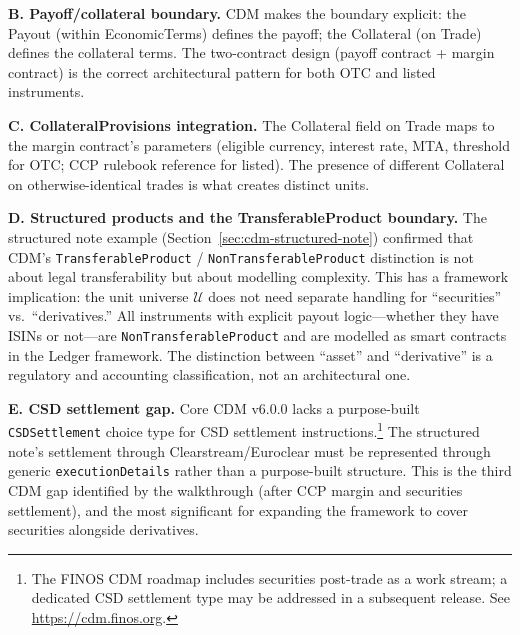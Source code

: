 \documentclass[11pt,a4paper]{article}
\begin{document}
\medskip
\noindent\textbf{B. Payoff/collateral boundary.}
CDM makes the boundary explicit: the Payout (within EconomicTerms) defines the payoff; the Collateral (on Trade) defines the collateral terms. The two-contract design (payoff contract + margin contract) is the correct architectural pattern for both OTC and listed instruments.

\medskip
\noindent\textbf{C. CollateralProvisions integration.}
The Collateral field on Trade maps to the margin contract's parameters (eligible currency, interest rate, MTA, threshold for OTC; CCP rulebook reference for listed). The presence of different Collateral on otherwise-identical trades is what creates distinct units.

\medskip
\noindent\textbf{D. Structured products and the TransferableProduct boundary.}
The structured note example (Section~\ref{sec:cdm-structured-note}) confirmed that CDM's \texttt{TransferableProduct} / \texttt{NonTransferableProduct} distinction is not about legal transferability but about modelling complexity. This has a framework implication: the unit universe $\mathcal{U}$ does not need separate handling for ``securities'' vs.\ ``derivatives.'' All instruments with explicit payout logic---whether they have ISINs or not---are \texttt{NonTransferableProduct} and are modelled as smart contracts in the Ledger framework. The distinction between ``asset'' and ``derivative'' is a regulatory and accounting classification, not an architectural one.

\medskip
\noindent\textbf{E. CSD settlement gap.}
Core CDM v6.0.0 lacks a purpose-built \texttt{CSDSettlement} choice type for CSD settlement instructions.\footnote{The FINOS CDM roadmap includes securities post-trade as a work stream; a dedicated CSD settlement type may be addressed in a subsequent release. See \url{https://cdm.finos.org}.} The structured note's settlement through Clearstream/Euroclear must be represented through generic \texttt{executionDetails} rather than a purpose-built structure. This is the third CDM gap identified by the walkthrough (after CCP margin and securities settlement), and the most significant for expanding the framework to cover securities alongside derivatives.


\clearpage
\end{document}
